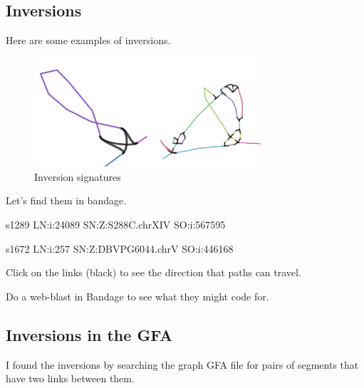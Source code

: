 \documentclass[
]{book}
\newenvironment{Shaded}{\begin{snugshade}}{\end{snugshade}}
\newcommand{\AttributeTok}[1]{\textcolor[rgb]{0.77,0.63,0.00}{#1}}
\newcommand{\FunctionTok}[1]{\textcolor[rgb]{0.00,0.00,0.00}{#1}}
\newcommand{\KeywordTok}[1]{\textcolor[rgb]{0.13,0.29,0.53}{\textbf{#1}}}
\newcommand{\NormalTok}[1]{#1}
\newcommand{\StringTok}[1]{\textcolor[rgb]{0.31,0.60,0.02}{#1}}
\begin{document}
\hypertarget{inversions}{%
\subsection*{Inversions}\label{inversions}}

Here are some examples of inversions.

\begin{figure}
\centering
\includegraphics[width=0.75\textwidth,height=\textheight]{./Figures/Inversionsx2.png}
\caption{Inversion signatures}
\end{figure}

Let's find them in bandage.

s1289 LN:i:24089 SN:Z:S288C.chrXIV SO:i:567595

s1672 LN:i:257 SN:Z:DBVPG6044.chrV SO:i:446168

Click on the links (black) to see the direction that paths can travel.

Do a web-blast in Bandage to see what they might code for.

\hypertarget{inversions-in-the-gfa}{%
\subsection*{Inversions in the GFA}\label{inversions-in-the-gfa}}

I found the inversions by searching the graph GFA file for pairs of segments that have two links between them.

\begin{Shaded}
\end{Shaded}
\end{document}
